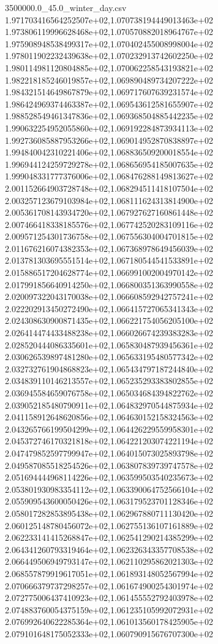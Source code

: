 \begin{filecontents*}{3500000.0_45.0_winter_day.csv}
1.971703416564252507e+02,1.070738194449013463e+02
1.973806119996628468e+02,1.070570882018964767e+02
1.975908948538499317e+02,1.070402455008998004e+02
1.978011902232439638e+02,1.070232913742602250e+02
1.980114981120804885e+02,1.070062258543193821e+02
1.982218185246019857e+02,1.069890489734207222e+02
1.984321514649867879e+02,1.069717607639231574e+02
1.986424969374463387e+02,1.069543612581655907e+02
1.988528549461347836e+02,1.069368504885442235e+02
1.990632254952055860e+02,1.069192284873934113e+02
1.992736085887953266e+02,1.069014952870838897e+02
1.994840042310221406e+02,1.068836509200018554e+02
1.996944124259729278e+02,1.068656954185007635e+02
1.999048331777376006e+02,1.068476288149813627e+02
2.001152664903728748e+02,1.068294511418107504e+02
2.003257123679103984e+02,1.068111624313814900e+02
2.005361708143934720e+02,1.067927627160861448e+02
2.007466418338185576e+02,1.067742520283109116e+02
2.009571254301736758e+02,1.067556304004701815e+02
2.011676216074382353e+02,1.067368978649456039e+02
2.013781303695551514e+02,1.067180544541533891e+02
2.015886517204628774e+02,1.066991002004970142e+02
2.017991856640914250e+02,1.066800351363990558e+02
2.020097322043170038e+02,1.066608592942757241e+02
2.022202913450272490e+02,1.066415727065341343e+02
2.024308630900871435e+02,1.066221754056205100e+02
2.026414474433488238e+02,1.066026674239383283e+02
2.028520444086335601e+02,1.065830487939456361e+02
2.030626539897481280e+02,1.065633195480577342e+02
2.032732761904868823e+02,1.065434797187244840e+02
2.034839110146213557e+02,1.065235293383802855e+02
2.036945584659076758e+02,1.065034684394822762e+02
2.039052185480790911e+02,1.064832970544875934e+02
2.041158912648620856e+02,1.064630152158324563e+02
2.043265766199504299e+02,1.064426229559958301e+02
2.045372746170321818e+02,1.064221203074221194e+02
2.047479852597799947e+02,1.064015073025893798e+02
2.049587085518254526e+02,1.063807839739747578e+02
2.051694444968114226e+02,1.063599503540235673e+02
2.053801930983354112e+02,1.063390064752566104e+02
2.055909543600050426e+02,1.063179523701128346e+02
2.058017282853895438e+02,1.062967880711130420e+02
2.060125148780456072e+02,1.062755136107161889e+02
2.062233141415268847e+02,1.062541290214385299e+02
2.064341260793319464e+02,1.062326343357708538e+02
2.066449506949793147e+02,1.062110295862021303e+02
2.068557879919617051e+02,1.061893148052567994e+02
2.070666379737298257e+02,1.061674900254301974e+02
2.072775006437410923e+02,1.061455552792403978e+02
2.074883760054375159e+02,1.061235105992072931e+02
2.076992640622285364e+02,1.061013560178425905e+02
2.079101648175052333e+02,1.060790915676707300e+02

\end{filecontents*}
